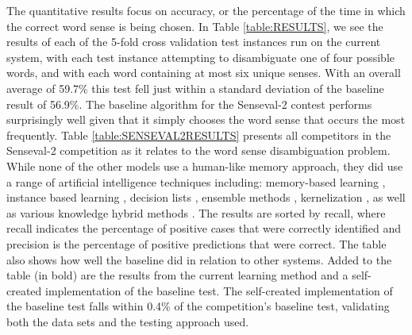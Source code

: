The quantitative results focus on accuracy, or the percentage of the time in which
the correct word sense is being chosen.
In Table \ref{table:RESULTS}, we see the results of each of the 5-fold cross
validation test instances run on the current system, with each test instance attempting
to disambiguate one of four possible words, and with each word containing at most six unique senses.
With an overall average of
59.7\% this test fell just within a standard deviation of the baseline result of
56.9\%. The baseline algorithm for the Senseval-2 contest performs surprisingly
well given that it simply chooses the word sense that occurs the most frequently. Table \ref{table:SENSEVAL2RESULTS} 
presents all competitors in the Senseval-2 competition as it relates to the word sense disambiguation problem. 
While none of the other models use a human-like memory approach, they did use a range of artificial intelligence 
techniques including: memory-based learning
\cite{GAMBL, PARAM_OPT, MEM-BASED}, instance based learning
\cite{INSTANCE_LEARN}, decision lists \cite{YarrowskyDL}, ensemble methods
\cite{ENSEMBLE}, kernelization \cite{KERNEL}, as well as various knowledge
hybrid methods \cite{HAWKWSD}. The results are sorted by recall, where recall indicates the percentage of 
positive cases that were correctly identified and precision is the percentage 
of positive predictions that were correct.  The table also shows how well the 
baseline did in  relation to other systems. Added to the table (in bold) are 
the results from the current learning method and a self-created implementation 
of the baseline test. The self-created implementation of the baseline test falls 
within 0.4\% of the competition's baseline test, validating both the data sets and the testing
approach used.


